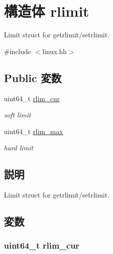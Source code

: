 \hypertarget{structArmLinux64_1_1rlimit}{
\section{構造体 rlimit}
\label{structArmLinux64_1_1rlimit}
}


Limit struct for getrlimit/setrlimit.  


{\ttfamily \#include $<$linux.hh$>$}\subsection*{Public 変数}
\begin{DoxyCompactItemize}
\item 
uint64\_\-t \hyperlink{structArmLinux64_1_1rlimit_af39897d07737cb27ef9484ae73c05fa4}{rlim\_\-cur}
\begin{DoxyCompactList}\small\item\em soft limit \item\end{DoxyCompactList}\item 
uint64\_\-t \hyperlink{structArmLinux64_1_1rlimit_af8e4fdfd658610e9b762fb606dce339a}{rlim\_\-max}
\begin{DoxyCompactList}\small\item\em hard limit \item\end{DoxyCompactList}\end{DoxyCompactItemize}


\subsection{説明}
Limit struct for getrlimit/setrlimit. 

\subsection{変数}
\hypertarget{structArmLinux64_1_1rlimit_af39897d07737cb27ef9484ae73c05fa4}{
\subsubsection[{rlim\_\-cur}]{\setlength{\rightskip}{0pt plus 5cm}uint64\_\-t {\bf rlim\_\-cur}}}
\label{structArmLinux64_1_1rlimit_af39897d07737cb27ef9484ae73c05fa4}


